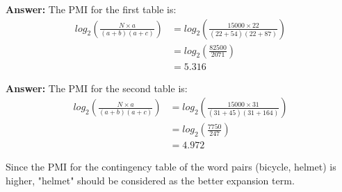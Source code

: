 \documentclass[11pt]{article}
\begin{document}
\begin{enumerate}
        \textbf{Answer:} The PMI for the first table is:
        \begin{align*}
            log_2\left(\frac{N\times a}{(a+b)(a+c)}\right) &= log_2\left(\frac{15000\times 22}{(22+54)(22+87)}\right) \\
            &= log_2\left(\frac{82500}{2071}\right) \\
            &= 5.316
        \end{align*}

        \textbf{Answer:} The PMI for the second table is:
        \begin{align*}
            log_2\left(\frac{N\times a}{(a+b)(a+c)}\right) &= log_2\left(\frac{15000\times 31}{(31+45)(31+164)}\right) \\
            &= log_2\left(\frac{7750}{247}\right) \\
            &= 4.972
        \end{align*}

        Since the PMI for the contingency table of the word pairs (bicycle, helmet) is higher, "helmet" should be considered as the better expansion term.

    \end{enumerate}
\end{document}
